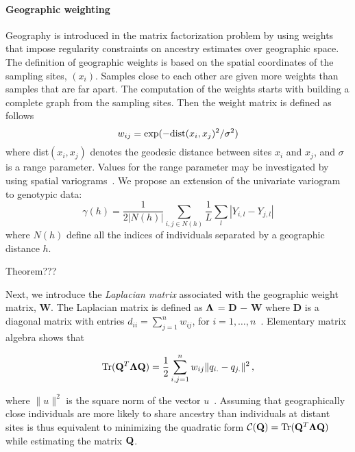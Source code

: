 \paragraph{Geographic weighting} Geography is introduced in the matrix factorization problem by using weights that impose regularity constraints on ancestry estimates over geographic space. The definition of geographic weights is based on the spatial coordinates of the sampling sites, $(x_i)$. Samples close to each other are given more weights than samples that are far apart. The computation of the weights starts with building a complete graph from the sampling sites. Then the weight matrix is defined as follows
$$
w_{ij} = \exp( - {\rm dist}( x_i, x_j )^2/ \sigma^2)
$$
\noindent where dist$( x_i, x_j )$ denotes the geodesic distance between sites $x_i$ and  $x_j$, and $\sigma$ is a range parameter. Values for the range parameter may be investigated by using spatial variograms~\citep{Cressie1993}. We propose an extension of the univariate variogram to genotypic data:
$$
\gamma(h) = \frac{1}{2 |N(h)|} \sum_{i,j \in N(h)} \frac{1}{L} \sum_{l} |Y_{i,l} - Y_{j,l}|
$$
\noindent where $N(h)$ define all the indices of individuals separated by a geographic distance $h$. 

Theorem???


Next, we introduce the {\it Laplacian matrix} associated with the geographic weight matrix, {\bf W}. The Laplacian matrix is defined as ${\bf \Lambda}$ =  {\bf D} $-$ {\bf W}  where  {\bf D} is a diagonal matrix with entries 
$d_{ii} = \sum_{j = 1}^n w_{ij}$,  for  $i = 1, \dots, n$~\citep{Belkin2003}. Elementary matrix algebra shows that 

$$
 {\rm Tr} ({\bf Q}^T {\bf \Lambda} {\bf Q})  = \frac12 \sum_{i,j = 1}^n  w_{ij}  \|   q_{i.}  - q_{j.} \|^2 \, ,
$$

 \noindent  where $\|  u \|^2$ is the square norm of the vector $u$~\citep{DengCai2011}. Assuming that geographically close individuals are more likely to share ancestry than individuals at distant sites  is thus equivalent to minimizing the quadratic form ${\cal C}({\bf Q}) ={\rm Tr} ({\bf Q}^T {\bf \Lambda} {\bf Q})$ while estimating the matrix ${\bf Q}$. 

